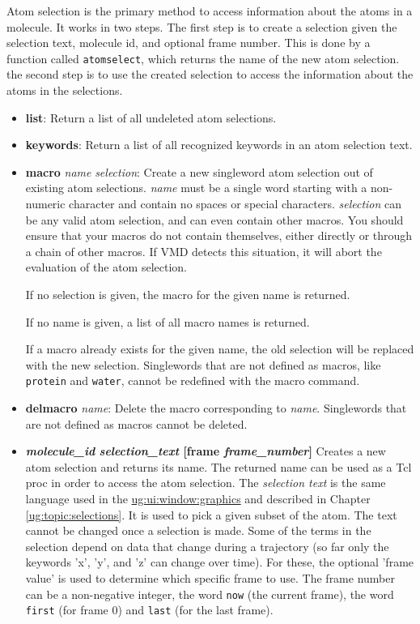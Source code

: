  Atom selection is the primary method to access information about
the atoms in a molecule.  It works in two steps. The first step is to create a
selection given the selection text, molecule id, and optional frame
number. This is done by a function called {\tt atomselect}, which returns the
name of the new atom selection. the second step is to use the created
selection to access the information about the atoms in the selections.
 
\begin{itemize}
  \item {\bf list}: Return a list of all undeleted atom selections.

  \item {\bf keywords}: Return a list of all recognized keywords in an atom
  selection text.

  \item {\bf macro} {\it name} {\it selection}: Create a new singleword atom
selection out of existing atom selections.  {\it name} must be a single word
starting with a non-numeric character and contain no spaces or special 
characters.  {\it selection} can be any
valid atom selection, and can even contain other macros.  You should ensure 
that your macros do not contain themselves, either directly or through a chain
of other macros.  If VMD detects this situation, it will abort the evaluation
of the atom selection.

If no selection is given, the macro for the given name is returned.

If no name is given, a list of all macro names is returned.

If a macro already exists for the given name, the old selection will
be replaced with the new selection.  Singlewords that are not defined
as macros, like {\tt protein} and {\tt water}, cannot be redefined with
the macro command.

  \item {\bf delmacro} {\it name}: Delete the macro corresponding to {\it name}.
Singlewords that are not defined as macros cannot be deleted.

  \item {\bf {\it molecule\_id} {\it selection\_text}
[frame {\it frame\_number}]}
	Creates a new atom selection and returns its name.  The returned name
can be used as a Tcl proc in order to access the atom selection.  
  The {\it selection text} is the same language used in
the \hyperref{{\sf Graphics} window}{{\sf Graphics} window [\S~}{]}
{ug:ui:window:graphics} and described in
Chapter \ref{ug:topic:selections}.
It is used to pick a given subset of the atom.
The text cannot be changed once a selection is made.  Some of the terms
in the selection depend on data that change during a trajectory (so
far only the keywords 'x', 'y', and 'z' can change over time).  For
these, the optional 'frame value' is used to determine which specific
frame to use.  The frame number can be a non-negative integer, the word
{\tt now} (the current frame), the word {\tt first} (for frame 0) 
and {\tt last} (for the last frame).


\end{itemize}
